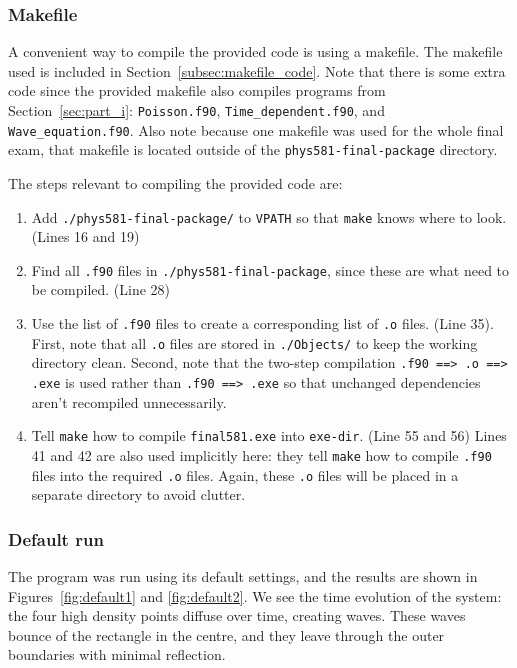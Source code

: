 \documentclass[twocolumn]{myarticle}
\numberwithin{equation}{section}
\begin{document}
\subsubsection{Makefile}
\label{subsubsec:makefile}

A convenient way to compile the provided code is using a makefile.
The makefile used is included in Section~\ref{subsec:makefile_code}.
Note that there is some extra code since the provided makefile also compiles programs from Section~\ref{sec:part_i}: \texttt{Poisson.f90}, \texttt{Time\_dependent.f90}, and \texttt{Wave\_equation.f90}.
Also note because one makefile was used for the whole final exam, that makefile is located outside of the \texttt{phys581-final-package} directory.

The steps relevant to compiling the provided code are:
\begin{enumerate}
\item
    Add \texttt{./phys581-final-package/} to \texttt{VPATH} so that \texttt{make} knows where to look. (Lines 16 and 19)
\item
    Find all \texttt{.f90} files in \texttt{./phys581-final-package}, since these are what need to be compiled. (Line 28)
\item
    Use the list of \texttt{.f90} files to create a corresponding list of \texttt{.o} files. (Line 35).
    First, note that all \texttt{.o} files are stored in \texttt{./Objects/} to keep the working directory clean.
    Second, note that the two-step compilation \texttt{.f90 ==> .o ==> .exe} is used rather than \texttt{.f90 ==> .exe} so that unchanged dependencies aren't recompiled unnecessarily.
\item
    Tell \texttt{make} how to compile \texttt{final581.exe} into \texttt{exe-dir}. (Line 55 and 56)
    Lines 41 and 42 are also used implicitly here: they tell \texttt{make} how to compile \texttt{.f90} files into the required \texttt{.o} files.
    Again, these \texttt{.o} files will be placed in a separate directory to avoid clutter.
\end{enumerate}

\subsubsection{Default run}
\label{subsubsec:default_run}

The program was run using its default settings, and the results are shown in Figures~\ref{fig:default1} and \ref{fig:default2}.
We see the time evolution of the system: the four high density points diffuse over time, creating waves.
These waves bounce of the rectangle in the centre, and they leave through the outer boundaries with minimal reflection.
\end{document}
